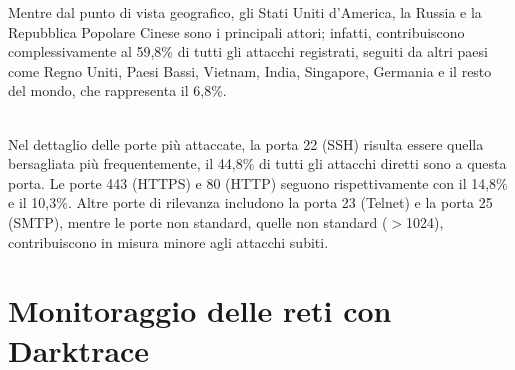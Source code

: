 Mentre dal punto di vista geografico, gli Stati Uniti d'America, la Russia e la Repubblica Popolare Cinese sono i principali attori; infatti, contribuiscono complessivamente al 59,8\% di tutti gli attacchi registrati, seguiti da altri paesi come Regno Uniti, Paesi Bassi, Vietnam, India, Singapore, Germania e il resto del mondo, che rappresenta il 6,8\%.\\
\\
Nel dettaglio delle porte più attaccate, la porta 22 (SSH) risulta essere quella bersagliata più frequentemente, il 44,8\% di tutti gli attacchi diretti sono a questa porta. Le porte 443 (HTTPS) e 80 (HTTP) seguono rispettivamente con il 14,8\% e il 10,3\%. Altre porte di rilevanza includono la porta 23 (Telnet) e la porta 25 (SMTP), mentre le porte non standard, quelle non standard ($>$1024), contribuiscono in misura minore agli attacchi subiti.

\section{Monitoraggio delle reti con Darktrace}
